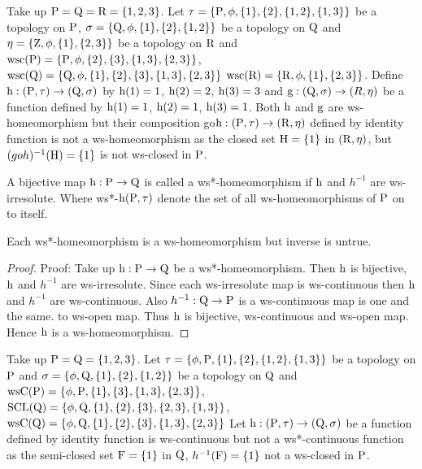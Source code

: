 \begin{exm}\label{exam5.2.16}
Take up $\mathrm{P}=\mathrm{Q}=\mathrm{R}= \{1, 2, 3\}$. Let $\tau= \{\TSP, \phi, \{1\}, \{2\}, \{1,2\},\break \{1,3\}\}$ be a topology on $\mathrm{P}$, $\sigma= \{\mathrm{Q}, \phi, \{1\}, \{2\}, \{1,2\}\}$ be a topology on $\mathrm{Q}$ and $\eta= \{\mathrm{Z}, \phi, \{1\}, \{2,3\}\}$ be a topology on $\mathrm{R}$ and $\mathrm{wsc}(\mathrm{P})= \{\mathrm{P}, \phi, \{2\}, \{3\}, \{1, 3\}, \{2, 3\}\}$, $\mathrm{wsc}(\mathrm{Q})= \{\mathrm{Q}, \phi, \{1\},\{2\}, \{3\}, \{1,3\}, \{2, 3\}\}$ $\mathrm{wsc}(\mathrm{R})= \{\mathrm{R}, \phi, \{1\}, \{2, 3\}\}$. Define $\mathrm{h}: (\mathrm{P}, \tau) \to (\mathrm{Q},\sigma)$ by $\mathrm{h}(1)=1$, $\mathrm{h}(2) =2$, $\mathrm{h}(3)=3$ and $\mathrm{g}: (\mathrm{Q},\sigma)\to (R, \eta)$ be a function defined by $\mathrm{h}(1)=1$, $\mathrm{h}(2)= 1$, $\mathrm{h}(3)=1$. Both $\mathrm{h}$ and $\mathrm{g}$ are ws-homeomorphism but their composition go$\mathrm{h}: (\mathrm{P}, \tau)\to (\mathrm{R}, \eta)$ defined by identity function is not a ws-homeomorphism as the closed set $\mathrm{H}=\{1\}$ in $(\mathrm{R}, \eta)$, but $(goh)^{-1} (\mathrm{H})=\{1\}$ is not ws-closed in $\mathrm{P}$.
\end{exm}

\begin{dfn}\label{defi5.2.17}
A bijective map $\mathrm{h}: \mathrm{P}\to \mathrm{Q}$ is called a ws*-homeomorphism if $\mathrm{h}$ and $h^{-1}$ are ws-irresolute. Where ws*-$\mathrm{h}(\mathrm{P}, \tau)$ denote the set of all ws-homeomorphisms of $\mathrm{P}$ on to itself.
\end{dfn}

\begin{thm}\label{thm5.2.18}
Each ws*-homeomorphism is a ws-homeomorphism but inverse is untrue.
\end{thm}

\begin{proof}
Proof: Take up $\mathrm{h}: \mathrm{P}\to \mathrm{Q}$ be a ws*-homeomorphism. Then $\mathrm{h}$ is bijective, $\mathrm{h}$ and $h^{-1}$ are ws-irresolute. Since each ws-irresolute map is ws-continuous then $\mathrm{h}$ and $h^{-1}$ are ws-continuous. Also $h^{-1} : \mathrm{Q} \to \mathrm{P}$ is a ws-continuous map is one and the same. to ws-open map. Thus $\mathrm{h}$ is bijective, ws-continuous and ws-open map. Hence $\mathrm{h}$ is a ws-homeomorphism.
\end{proof}

\begin{exm}\label{exam5.2.19}
Take up $\mathrm{P}=\mathrm{Q}= \{1, 2, 3\}$. Let $\tau= \{\phi, \mathrm{P}, \{1\}, \{2\}, \{1,2\},\{1,3\}\}$ be a topology on $\mathrm{P}$ and $\sigma=\{\phi, \mathrm{Q}, \{1\}, \{2\},\{1,2\}\}$ be a topology on $\mathrm{Q}$ and $\ws\TSC(\TSP)\break = \{\phi, \TSP, \{1\},\{3\}, \{1,3\},\{2,3\}\}$, $\mathrm{SCL}(\mathrm{Q}) =\{\phi, \mathrm{Q}, \{1\},\{2\},\{3\},\{2, 3\},\{1,3\}\}$,\break $\mathrm{ws}\mathrm{C}(\mathrm{Q})= \{\phi, \mathrm{Q}, \{1\},\{2\},\{3\}, \{1,3\},\{2,3\}\}$ Let $\mathrm{h}: (\mathrm{P}, \tau )\to (\mathrm{Q}, \sigma)$ be a function defined by identity function is ws-continuous but not a ws*-continuous function as the semi-closed set $\mathrm{F}=\{1\}$ in $\mathrm{Q}$, $h^{-1}(\mathrm{F})=\{1\}$ not a ws-closed in $\mathrm{P}$.
\end{exm}

